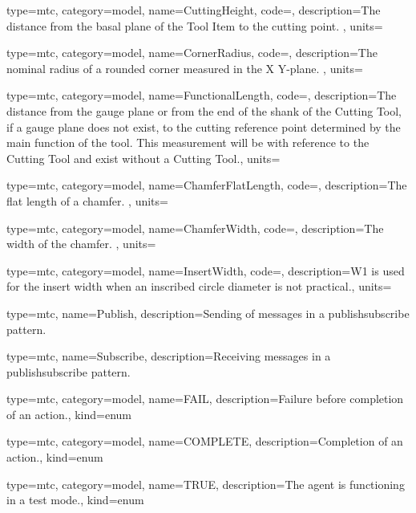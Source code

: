 {
  type=mtc,
  category=model,
  name={CuttingHeight},
  code=,
  description={The distance from the basal plane of the Tool Item to the cutting point. },
  units=
}


{
  type=mtc,
  category=model,
  name={CornerRadius},
  code=,
  description={The nominal radius of a rounded corner measured in the X Y-plane. },
  units=
}


{
  type=mtc,
  category=model,
  name={FunctionalLength},
  code=,
  description={The distance from the gauge plane or from the end of the shank of the Cutting Tool, if a gauge plane does not exist, to the cutting reference point determined by the main function of the tool. This measurement will be with reference to the Cutting Tool and \MUSTNOT exist without a Cutting Tool.},
  units=
}


{
  type=mtc,
  category=model,
  name={ChamferFlatLength},
  code=,
  description={The flat length of a chamfer. },
  units=
}


{
  type=mtc,
  category=model,
  name={ChamferWidth},
  code=,
  description={The width of the chamfer. },
  units=
}


{
  type=mtc,
  category=model,
  name={InsertWidth},
  code=,
  description={W1 is used for the insert width when an inscribed circle diameter is not practical.},
  units=
}


{
  type=mtc,
  name={Publish},
  description={Sending of messages in a \gls{publishsubscribe} pattern.}
}


{
  type=mtc,
  name={Subscribe},
  description={Receiving messages in a \gls{publishsubscribe} pattern.}
}



{
  type=mtc,
  category=model,
  name={FAIL},
  description={Failure before completion of an action.},
  kind={enum}
}


{
  type=mtc,
  category=model,
  name={COMPLETE},
  description={Completion of an action.},
  kind={enum}
}

{
  type=mtc,
  category=model,
  name={TRUE},
  description={The \gls{agent} is functioning in a test mode.},
  kind={enum}
}

